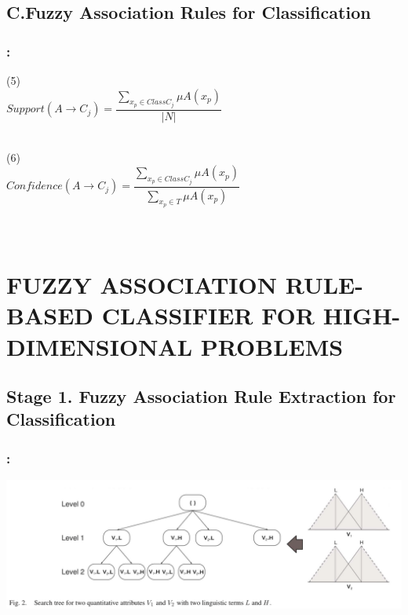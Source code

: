 \documentclass{beamer}
\begin{document}
\begin{CJK*}{UTF8}{bsmi}
\begin{frame}
\end{frame}


\subsection{C.Fuzzy Association Rules for Classification}


\begin{frame}
	\frametitle{\insertsection : \insertsubsection}
	
	\begin{block}{ (5)}
		~\\
		\centering\textbf{$Support(A\longrightarrow C_{j})=\dfrac{\sum_{x_{p}\in ClassC_{j}}^{ }{\mu A(x_{p})}}{|N|}$}\\
		~\\
	\end{block}
	\begin{block}{ (6)}
		~\\
		\centering\textbf{$Confidence(A\longrightarrow C_{j})=\dfrac{\sum_{x_{p}\in ClassC_{j}}^{ }{\mu A(x_{p})}}{\sum_{x_{p}\in T}^{ }{\mu A(x_{p})}}$}\\
		~\\
		
		~\\
	\end{block}
	
\end{frame}


\section{FUZZY ASSOCIATION RULE-BASED CLASSIFIER FOR HIGH-DIMENSIONAL  PROBLEMS}
\subsection{Stage 1. Fuzzy Association Rule Extraction for Classification}


\begin{frame}
	\frametitle{\insertsection : \insertsubsection}
\begin{center}
\includegraphics[width=1\linewidth]{./2.png}
\end{center}
\end{frame}


\end{CJK*}
\end{document}
